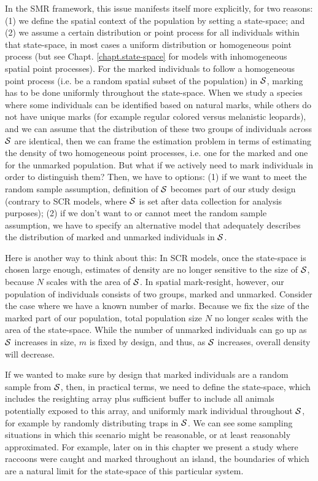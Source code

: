In the SMR framework, this issue manifests itself more explicitly, for
two reasons: (1) we define the spatial context of the population by
setting a state-space; and (2) we assume a certain distribution or
point process for all individuals within that state-space, in most
cases a uniform distribution or homogeneous point process (but see
Chapt. \ref{chapt.state-space} for models with inhomogeneous spatial
point processes). For the marked individuals to follow a homogeneous point process (i.e. be a random spatial
subset 
of the population) in ${\cal S}$, marking has to be done uniformly throughout the state-space. 
When we study a species where some
individuals can be identified based on natural marks, while others do
not have unique marks (for example regular colored versus melanistic
leopards), and we can assume that the distribution of these two groups
of individuals across ${\cal S}$ are identical, then we can frame the
estimation problem in terms of estimating the density of two
homogeneous point processes, i.e. one for the marked and one for the unmarked
population.
But what if we actively need to mark
individuals in order to distinguish them?  Then, we have to options: (1) if we want to meet
the random sample assumption, definition of ${\cal S}$ becomes
part of our study design (contrary to SCR models, where ${\cal S}$ is set after data collection for analysis
purposes); (2) if we don't want to or cannot meet the random sample assumption, we have to specify an alternative model that adequately describes the distribution of marked and unmarked individuals in ${\cal S}$.

Here is another way to think about this: In SCR models, once the
state-space is chosen large enough, estimates of density are no longer
sensitive to the size of ${\cal S}$, because $N$ scales with the area
of ${\cal S}$. In spatial mark-resight, however, our population of
individuals consists of two groups, marked and unmarked. Consider the
case where we have a known number of marks. Because we fix the size of
the marked part of our population, total population size $N$ no longer
scales with the area of the state-space. While the number of unmarked
individuals can go up as ${\cal S}$ increases in size, $m$ is fixed by
design, and thus, as ${\cal S}$ increases, overall density will
decrease. 

If we wanted to make sure by design that marked individuals are a
random sample from ${\cal S}$, then, in practical terms, we need to
define the state-space, which includes the resighting array plus
sufficient buffer to include all animals potentially exposed to this
array, and uniformly mark individual throughout ${\cal
  S}$, for example by randomly distributing traps in ${\cal
  S}$. We can see some sampling situations in which this
scenario might be reasonable, or at least reasonably
approximated. For example, later on in this chapter we present a study
where raccoons were caught and marked throughout an island, the
boundaries of which are a natural limit for the state-space of this
particular system. 

